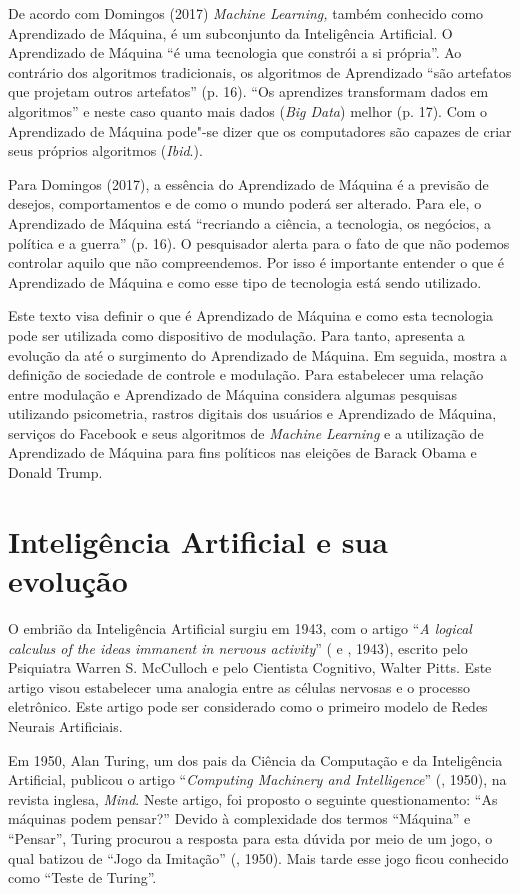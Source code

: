 De acordo com Domingos (2017) \emph{Machine Learning,} também conhecido
como Aprendizado de Máquina, é um subconjunto da Inteligência
Artificial. O Aprendizado de Máquina ``é uma tecnologia que constrói a
si própria''. Ao contrário dos algoritmos tradicionais, os algoritmos de
Aprendizado ``são artefatos que projetam outros artefatos'' (p. 16).
``Os aprendizes transformam dados em algoritmos'' e neste caso quanto
mais dados (\emph{Big Data}) melhor (p. 17). Com o Aprendizado de
Máquina pode"-se dizer que os computadores são capazes de criar seus
próprios algoritmos (\emph{Ibid}.).

Para Domingos (2017), a essência do Aprendizado de Máquina é a previsão
de desejos, comportamentos e de como o mundo poderá ser alterado. Para
ele, o Aprendizado de Máquina está ``recriando a ciência, a tecnologia,
os negócios, a política e a guerra'' (p. 16). O pesquisador alerta para
o fato de que não podemos controlar aquilo que não compreendemos. Por
isso é importante entender o que é Aprendizado de Máquina e como esse
tipo de tecnologia está sendo utilizado.

Este texto visa definir o que é Aprendizado de Máquina e como esta
tecnologia pode ser utilizada como dispositivo de modulação. Para tanto,
apresenta a evolução da  até o surgimento do Aprendizado de Máquina.
Em seguida, mostra a definição de sociedade de controle e modulação.
Para estabelecer uma relação entre modulação e Aprendizado de Máquina
considera algumas pesquisas utilizando psicometria, rastros digitais dos
usuários e Aprendizado de Máquina, serviços do Facebook e seus
algoritmos de \emph{Machine Learning} e a utilização de Aprendizado de
Máquina para fins políticos nas eleições de Barack Obama e Donald Trump.

\section{Inteligência Artificial e sua evolução}

O embrião da Inteligência Artificial surgiu em 1943, com o artigo
``\emph{A logical calculus of the ideas immanent in nervous activity}''
( e , 1943), escrito pelo Psiquiatra Warren S. McCulloch e
pelo Cientista Cognitivo, Walter Pitts. Este artigo visou estabelecer
uma analogia entre as células nervosas e o processo eletrônico. Este
artigo pode ser considerado como o primeiro modelo de Redes Neurais
Artificiais.

Em 1950, Alan Turing, um dos pais da Ciência da Computação e da
Inteligência Artificial, publicou o artigo ``\emph{Computing Machinery
and Intelligence}'' (, 1950), na revista inglesa, \emph{Mind}.
Neste artigo, foi proposto o seguinte questionamento: ``As máquinas
podem pensar?'' Devido à complexidade dos termos ``Máquina'' e
``Pensar'', Turing procurou a resposta para esta dúvida por meio de um
jogo, o qual batizou de ``Jogo da Imitação'' (, 1950). Mais tarde
esse jogo ficou conhecido como ``Teste de Turing''.

